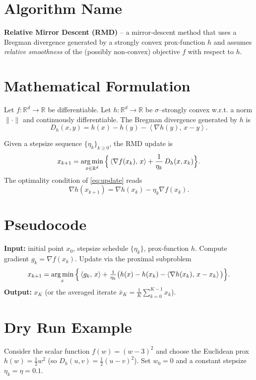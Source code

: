 \documentclass{article}
\newcommand{\inner}[2]{\left\langle #1,\,#2 \right\rangle}
\newcommand{\argmin}{\operatornamewithlimits{arg\,min}}
\newcommand{\D}[2]{D_{h}(#1,#2)}
\newcommand{\grad}{\nabla}
\begin{document}
\section*{Algorithm Name}
\textbf{Relative Mirror Descent (RMD)} – a mirror‑descent method that uses a Bregman divergence generated by a strongly convex prox‑function $h$ and assumes \emph{relative smoothness} of the (possibly non‑convex) objective $f$ with respect to $h$.

\section*{Mathematical Formulation}
Let $f:\mathbb{R}^{d}\rightarrow\mathbb{R}$ be differentiable.  
Let $h:\mathbb{R}^{d}\rightarrow\mathbb{R}$ be $ \sigma$–strongly convex w.r.t. a norm $\|\cdot\|$ and continuously differentiable.  
The Bregman divergence generated by $h$ is
\[
\D{x}{y}=h(x)-h(y)-\inner{\grad h(y)}{x-y}.
\]

Given a stepsize sequence $\{\eta_k\}_{k\ge0}$, the RMD update is
\begin{equation}
\label{eq:update}
x_{k+1}= \argmin_{x\in\mathbb{R}^{d}}
\Big\{ \inner{\grad f(x_k)}{x}+ \frac{1}{\eta_k}\,\D{x}{x_k}\Big\}.
\end{equation}
The optimality condition of \eqref{eq:update} reads
\begin{equation}
\label{eq:optcond}
\grad h(x_{k+1}) = \grad h(x_k)-\eta_k \grad f(x_k).
\end{equation}

\section*{Pseudocode}
\begin{algorithm}[H]
\caption{Relative Mirror Descent}
\begin{algorithmic}[1]
\STATE \textbf{Input:} initial point $x_0$, stepsize schedule $\{\eta_k\}$, prox‑function $h$.
\STATE Compute gradient $g_k=\grad f(x_k)$.
\STATE Update via the proximal subproblem
\[
x_{k+1}= \argmin_{x}\Big\{\inner{g_k}{x}+ \tfrac{1}{\eta_k}\big(h(x)-h(x_k)-\inner{\grad h(x_k)}{x-x_k}\big)\Big\}.
\]
\ENDFOR
\STATE \textbf{Output:} $x_K$ (or the averaged iterate $\bar x_K=\frac1K\sum_{k=0}^{K-1}x_k$).
\end{algorithmic}
\end{algorithm}

\section*{Dry Run Example}
Consider the scalar function $f(w)=(w-3)^2$ and choose the Euclidean prox $h(w)=\frac12 w^2$ (so $D_h(u,v)=\frac12 (u-v)^2$).  
Set $w_0=0$ and a constant stepsize $\eta_k=\eta=0.1$.
\end{document}
